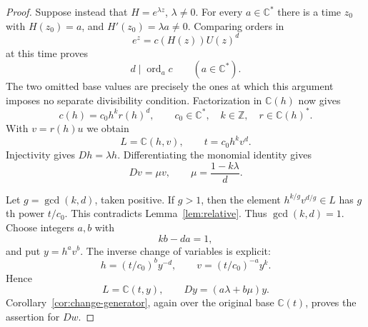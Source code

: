 \documentclass[10pt,a4paper]{amsart}
\newcommand{\C}{\mathbb C}
\newcommand{\Z}{\mathbb Z}
\newcommand{\ord}{\operatorname{ord}}
\begin{document}
\begin{proof}
Suppose instead that $H=e^{\lambda z}$, $\lambda\ne0$. For every
$a\in\C^*$ there is a time $z_0$ with $H(z_0)=a$, and
$H'(z_0)=\lambda a\ne0$. Comparing orders in
\[
 e^z=c(H(z))U(z)^d
\]
at this time proves
\begin{equation}
 d\mid\ord_a c\qquad(a\in\C^*).
 \label{eq:multiplicative-divisibility}
\end{equation}
The two omitted base values are precisely the ones at which this
argument imposes no separate divisibility condition. Factorization in
$\C(h)$ now gives
\begin{equation}
 c(h)=c_0h^k r(h)^d,
 \qquad c_0\in\C^*,\quad k\in\Z,
 \quad r\in\C(h)^*.
 \label{eq:monomial-coefficient}
\end{equation}
With $v=r(h)u$ we obtain
\begin{equation}
 L=\C(h,v),\qquad t=c_0h^kv^d.
 \label{eq:monomial-map}
\end{equation}
Injectivity gives $Dh=\lambda h$. Differentiating the monomial
identity gives
\begin{equation}
 Dv=\mu v,\qquad \mu=\frac{1-k\lambda}{d}.
 \label{eq:diagonal-derivation}
\end{equation}

Let $g=\gcd(k,d)$, taken positive. If $g>1$, then the element
$h^{k/g}v^{d/g}\in L$ has $g$th power $t/c_0$. This contradicts
Lemma~\ref{lem:relative}. Thus $\gcd(k,d)=1$.
Choose integers $a,b$ with
\begin{equation}
 kb-da=1,
 \label{eq:bezout}
\end{equation}
and put $y=h^av^b$. The inverse change of variables is explicit:
\begin{equation}
 h=(t/c_0)^b y^{-d},\qquad
 v=(t/c_0)^{-a}y^k.
 \label{eq:inverse-monomial}
\end{equation}
Hence
\begin{equation}
 L=\C(t,y),\qquad Dy=(a\lambda+b\mu)y.
 \label{eq:original-base-product}
\end{equation}
Corollary~\ref{cor:change-generator}, again over the original base
$\C(t)$, proves the assertion for $Dw$.
\end{proof}
\end{document}
